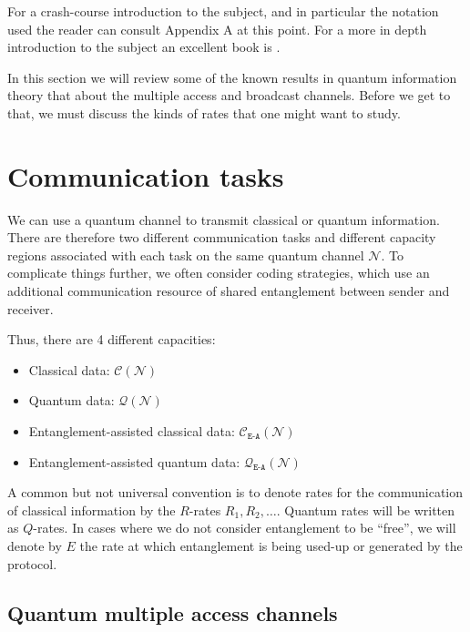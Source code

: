 \documentclass[aps,11pt,twoside,letterpaper]{article}
\begin{document}
	For a crash-course introduction to the subject, and in particular the notation
	used the reader can consult Appendix A at this point.
	For a more in depth introduction to the subject an excellent book is \cite{NC04}.


	In this section we will review some of the known results in quantum information theory
	that about the multiple access and broadcast channels. 
	Before we get to that, we must discuss the kinds of rates that one might want to study.


	\section{Communication tasks}
			
		We can use a quantum channel to transmit classical or quantum information.
		There are therefore two different communication tasks and different capacity regions
		associated with each task on the same quantum channel $\mathcal{N}$.
		To complicate things further, we often consider coding strategies, which use an additional
		communication resource of shared entanglement  between sender	and receiver.
		
		Thus, there are 4 different capacities:
		\begin{itemize}
			\item Classical data: $\mathcal{C}\!\left(\mathcal{N}\right)$ \vspace{-0.1in}
			\item Quantum data: $\mathcal{Q}\!\left(\mathcal{N}\right)$ \vspace{-0.1in}
			\item Entanglement-assisted classical data: $\mathcal{C}_{\texttt{E-A}}\!\left(\mathcal{N}\right)$ \vspace{-0.1in}
			\item Entanglement-assisted quantum data: $\mathcal{Q}_{\texttt{E-A}}\!\left(\mathcal{N}\right)$
		\end{itemize}
	
		A common but not universal convention is to denote rates for the communication
		of classical information by the $R$-rates $R_1,R_2,\ldots$. 
		Quantum rates will be written as  $Q$-rates.
		In cases where we do not consider entanglement to be ``free'', we will 
		denote by $E$ the rate at which entanglement is being used-up or generated
		by the protocol.
		
		
	\subsection{Quantum multiple access channels}
	
\end{document}

